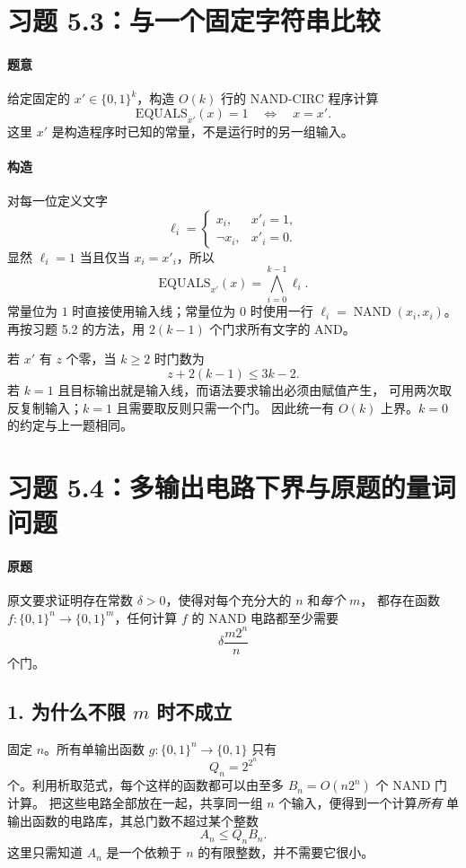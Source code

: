 \documentclass[UTF8,fontset=fandol,11pt,a4paper]{ctexart}
\newcommand{\bits}{\{0,1\}}
\newcommand{\NAND}{\operatorname{NAND}}
\begin{document}
\section{习题 5.3：与一个固定字符串比较}

\paragraph{题意}
给定固定的 $x'\in\bits^k$，构造 $O(k)$ 行的 NAND-CIRC 程序计算
\[
 \mathrm{EQUALS}_{x'}(x)=1\quad\Longleftrightarrow\quad x=x'.
\]
这里 $x'$ 是构造程序时已知的常量，不是运行时的另一组输入。

\paragraph{构造}
对每一位定义文字
\[
 \ell_i=
 \begin{cases}
  x_i,&x'_i=1,\\
  \neg x_i,&x'_i=0.
 \end{cases}
\]
显然 $\ell_i=1$ 当且仅当 $x_i=x'_i$，所以
\[
 \mathrm{EQUALS}_{x'}(x)=\bigwedge_{i=0}^{k-1}\ell_i.
\]
常量位为 $1$ 时直接使用输入线；常量位为 $0$ 时使用一行
$\ell_i=\NAND(x_i,x_i)$。
再按习题 5.2 的方法，用 $2(k-1)$ 个门求所有文字的 AND。

若 $x'$ 有 $z$ 个零，当 $k\ge2$ 时门数为
\[
 z+2(k-1)\le3k-2.
\]
若 $k=1$ 且目标输出就是输入线，而语法要求输出必须由赋值产生，
可用两次取反复制输入；$k=1$ 且需要取反则只需一个门。
因此统一有 $O(k)$ 上界。$k=0$ 的约定与上一题相同。

\section{习题 5.4：多输出电路下界与原题的量词问题}

\paragraph{原题}
原文要求证明存在常数 $\delta>0$，使得对每个充分大的 $n$ 和\emph{每个} $m$，
都存在函数 $f:\bits^n\to\bits^m$，任何计算 $f$ 的 NAND 电路都至少需要
\[
 \delta\frac{m2^n}{n}
\]
个门。

\subsection*{1. 为什么不限 $m$ 时不成立}
固定 $n$。所有单输出函数 $g:\bits^n\to\bits$ 只有
\[
 Q_n=2^{2^n}
\]
个。利用析取范式，每个这样的函数都可以由至多 $B_n=O(n2^n)$ 个 NAND 门计算。
把这些电路全部放在一起，共享同一组 $n$ 个输入，便得到一个计算\emph{所有}
单输出函数的电路库，其总门数不超过某个整数
\[
 A_n\le Q_nB_n.
\]
这里只需知道 $A_n$ 是一个依赖于 $n$ 的有限整数，并不需要它很小。
\end{document}
